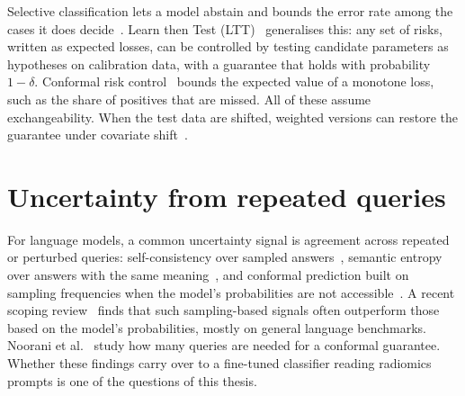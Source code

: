 Selective classification lets a model abstain and bounds the error rate among the cases it does
decide~\citep{geifman2017}. Learn then Test (LTT)~\citep{angelopoulos2021ltt} generalises this: any
set of risks, written as expected losses, can be controlled by testing candidate parameters as
hypotheses on calibration data, with a guarantee that holds with probability $1 - \delta$. Conformal
risk control~\citep{angelopoulos2024crc} bounds the expected value of a monotone loss, such as the
share of positives that are missed. All of these assume exchangeability. When the test data are
shifted, weighted versions can restore the guarantee under covariate shift~\citep{tibshirani2019}.

\section{Uncertainty from repeated queries}
\label{sec:bg-queries}

For language models, a common uncertainty signal is agreement across repeated or perturbed
queries: self-consistency over sampled answers~\citep{wang2023selfconsistency}, semantic entropy
over answers with the same meaning~\citep{kuhn2023semantic}, and conformal prediction built on
sampling frequencies when the model's probabilities are not accessible~\citep{su2024api}. A recent
scoping review~\citep{ashby2026} finds that such sampling-based signals often outperform those
based on the model's probabilities, mostly on general language benchmarks. Noorani et
al.~\citep{noorani2025} study how many queries are needed for a conformal guarantee. Whether these
findings carry over to a fine-tuned classifier reading radiomics prompts is one of the questions of
this thesis.
